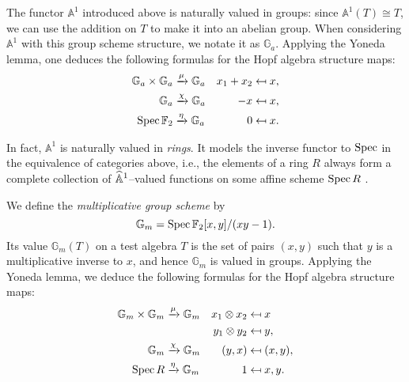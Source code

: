 \begin{example}\label{InformalAdditiveGroupExample}
The functor $\mathbb A^1$ introduced above is naturally valued in groups: since $\mathbb A^1(T) \cong T$, we can use the addition on $T$ to make it into an abelian group.  When considering $\mathbb A^1$ with this group scheme structure, we notate it as $\mathbb G_a$.  Applying the Yoneda lemma, one deduces the following formulas for the Hopf algebra structure maps:
\begin{align*}
\mathbb G_a \times \mathbb G_a & \xrightarrow{\mu} \mathbb G_a & x_1 + x_2 & \mapsfrom x, \\
\mathbb G_a & \xrightarrow{\chi} \mathbb G_a & -x & \mapsfrom x, \\
\operatorname{Spec} \mathbb F_2 & \xrightarrow{\eta} \mathbb G_a & 0 & \mapsfrom x.
\end{align*}
\end{example}

\begin{remark}
In fact, $\mathbb A^1$ is naturally valued in \emph{rings}. It models the inverse functor to $\operatorname{Spec}$ in the equivalence of categories above, i.e., the elements of a ring $R$ always form a complete collection of $\widehat{\mathbb{A}}^1$--valued functions on some affine scheme $\operatorname{Spec} R$ .
\end{remark}

\begin{example}
We define the \textit{multiplicative group scheme} by \[\mathbb G_m = \operatorname{Spec} \mathbb F_2[x, y] / (xy - 1).\]  Its value $\mathbb G_m(T)$ on a test algebra $T$ is the set of pairs $(x, y)$ such that $y$ is a multiplicative inverse to $x$, and hence $\mathbb G_m$ is valued in groups.  Applying the Yoneda lemma, we deduce the following formulas for the Hopf algebra structure maps:
\begin{align*}
\mathbb G_m \times \mathbb G_m & \xrightarrow{\mu} \mathbb G_m & x_1 \otimes x_2 & \mapsfrom x \\
& & y_1 \otimes y_2 & \mapsfrom y, \\
\mathbb G_m & \xrightarrow{\chi} \mathbb G_m & (y, x) & \mapsfrom (x, y), \\
\operatorname{Spec} R & \xrightarrow{\eta} \mathbb G_m & 1 & \mapsfrom x, y.
\end{align*}
\end{example}

